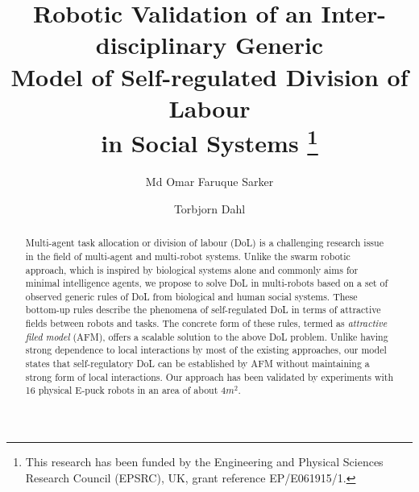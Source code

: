 \documentclass{llncs}
\begin{document}
\title{Robotic Validation of an Inter-disciplinary Generic\\
Model of Self-regulated Division of Labour\\ in Social Systems
\thanks{This research has been funded by the Engineering and Physical Sciences Research Council (EPSRC), UK, grant reference EP/E061915/1.}
}
\author{Md Omar Faruque Sarker \and
Torbjorn Dahl %
}
\maketitle
\begin{abstract}
Multi-agent task allocation or division of labour (DoL) is a challenging research issue in the field of multi-agent and multi-robot systems. Unlike the swarm robotic approach, which is inspired by biological systems alone and commonly aims for minimal intelligence agents, we propose to solve DoL in multi-robots based on a set of observed generic rules of DoL from biological and human social systems. These bottom-up rules describe the phenomena of self-regulated DoL in terms of attractive fields between robots and tasks. The concrete form of these rules, termed as \textit{attractive filed model} (AFM), offers a scalable solution to the above DoL problem. Unlike having strong dependence to local interactions by most of the existing approaches, our model states that self-regulatory DoL can be established by AFM without maintaining a strong form of local interactions. Our approach has been validated by experiments with 16 physical E-puck robots in an area of about 4$m^2$.
\end{abstract}
\end{document}
